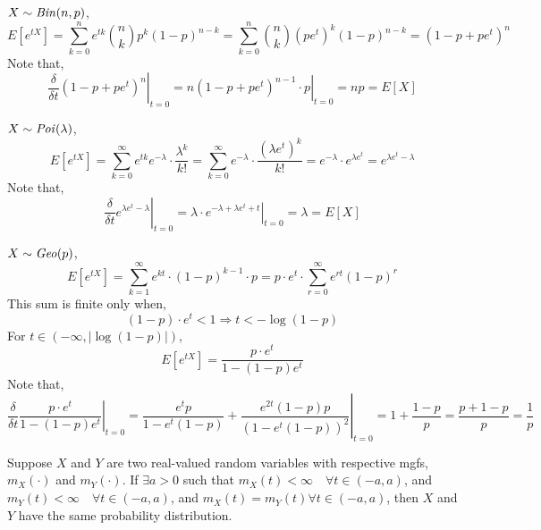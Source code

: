 \begin{example}
    $X \sim \text{\emph{Bin}}(n, p)$,
    \[
         E[e^{tX}] = \sum_{k = 0}^n e^{tk} {n \choose k} p^k (1 - p)^{n - k}
                   = \sum_{k = 0}^n {n \choose k} (pe^t)^k (1 - p)^{n - k}
                   = (1 - p + p e^t)^n
    \]
    Note that,
    \[
         \left. \frac{\delta}{\delta t} (1 - p + p e^t)^n \right \vert_{t = 0}
       = \left. n (1 - p + p e^t)^{n - 1} \cdot p \right \vert_{t = 0}
       = n p
       = E[X]
    \]
\end{example}

\begin{example}
    $X \sim \text{\emph{Poi}}(\lambda)$,
    \[
         E[e^{tX}] = \sum_{k = 0}^\infty e^{tk} e^{-\lambda} \cdot
                     \frac{\lambda^k}{k!}
                   = \sum_{k = 0}^\infty e^{-\lambda} \cdot
                     \frac{(\lambda e^t)^k}{k!}
                   = e^{-\lambda} \cdot e^{\lambda e^t}
                   = e^{\lambda e^t - \lambda}
    \]
    Note that,
    \[
         \left. \frac{\delta}{\delta t} e^{\lambda e^t - \lambda} \right
             \vert_{t = 0}
       = \left. \lambda \cdot e^{-\lambda + \lambda e^t + t} \right
             \vert_{t = 0}
       = \lambda
       = E[X]
    \]
\end{example}

\begin{example}
    $X \sim \text{\emph{Geo}}(p)$,
    \[
        E[e^{tX}] = \sum_{k = 1}^\infty e^{kt} \cdot (1 - p)^{k - 1} \cdot p
                  = p \cdot e^t \cdot \sum_{r = 0}^\infty e^{rt} (1 - p)^r
    \]
    This sum is finite only when,
    \[ (1 - p) \cdot e^t < 1 \Rightarrow t < -\log{(1 - p)}                  \]
    For $t \in (- \infty, \vert \log{(1 - p)} \vert)$,
    \[ E[e^{tX}] = \frac{p \cdot e^t}{1 - (1 - p)e^t}                        \]
    Note that,
    \[
\left. \frac{\delta}{\delta t} \frac{p \cdot e^t}{1 - (1 - p)e^t} \right
            \vert_{t = 0}
      = \left. \frac{e^t p}{1 - e^t(1 - p)} +
               \frac{e^{2t} (1 - p) p}{(1 - e^t(1 - p))^2}
                                                           \right\vert_{t = 0}
      = 1 + \frac{1 - p}{p}
      = \frac{p + 1 - p}{p}
      = \frac{1}{p}
                                                                             \]
\end{example}

\begin{theorem}
    Suppose $X$ and $Y$ are two real-valued random variables with respective
mgfs, $m_X(\cdot)$ and $m_Y(\cdot)$. If $\exists a > 0$ such that $m_X(t) <
\infty \quad \forall t \in (-a, a)$, and $m_Y(t) < \infty \quad \forall t
\in (-a, a)$, and $m_X(t) = m_Y(t) \forall t \in (-a, a)$, then $X$ and $Y$
have the same probability distribution.
\end{theorem}

